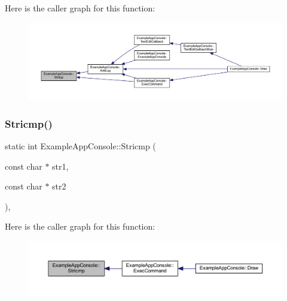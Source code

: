 Here is the caller graph for this function\+:
\nopagebreak
\begin{figure}[H]
\begin{center}
\leavevmode
\includegraphics[width=350pt]{struct_example_app_console_a61d0da41ef31ea8690b23681a1e54dba_icgraph}
\end{center}
\end{figure}
\mbox{\label{struct_example_app_console_a6e5e5d66e77618eff0f89785261c9391}} 
\subsubsection{\texorpdfstring{Stricmp()}{Stricmp()}}
{\footnotesize\ttfamily static int Example\+App\+Console\+::\+Stricmp (\begin{DoxyParamCaption}\item[{const char $\ast$}]{str1,  }\item[{const char $\ast$}]{str2 }\end{DoxyParamCaption})\hspace{0.3cm}{\ttfamily [inline]}, {\ttfamily [static]}}

Here is the caller graph for this function\+:
\nopagebreak
\begin{figure}[H]
\begin{center}
\leavevmode
\includegraphics[width=350pt]{struct_example_app_console_a6e5e5d66e77618eff0f89785261c9391_icgraph}
\end{center}
\end{figure}
\mbox{\label{struct_example_app_console_a11bcb7a4b801e5eeb0c098c082fedc25}} 
